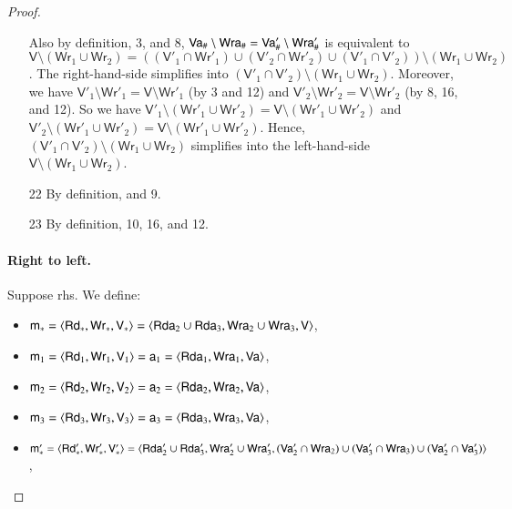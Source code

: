 \documentclass{llncs}
\newcommand{\modl}{\mathsf m}
\newcommand{\readset}{\mathsf{Rd}}
\newcommand{\valuset}{\mathsf{V}}
\newcommand{\writeset}{\mathsf{Wr}}
\newcommand{\tuple}[1]{ \langle #1 \rangle}
\begin{document}
\begin{proof}
\begin{itemize}
  Also by definition, 3, and 8, $\mathsf {Va}_\# \setminus \mathsf {Wra}_\# = \mathsf {Va}'_\# \setminus \mathsf {Wra}'_\#$ is equivalent to $\valuset \setminus (\writeset_1 \cup \writeset_2) = ((\valuset'_1 \cap \writeset'_1) \cup (\valuset'_2 \cap \writeset'_2) \cup (\valuset'_1 \cap \valuset'_2)) \setminus (\writeset_1 \cup \writeset_2)$. The right-hand-side simplifies into $(\valuset'_1 \cap \valuset'_2) \setminus (\writeset_1 \cup \writeset_2)$. Moreover, we have $\valuset'_1 \setminus \writeset'_1 = \valuset \setminus \writeset'_1$ (by 3 and 12) and $\valuset'_2 \setminus \writeset'_2 = \valuset \setminus \writeset'_2$ (by 8, 16, and 12). So we have $\valuset'_1 \setminus (\writeset'_1 \cup \writeset'_2) = \valuset \setminus (\writeset'_1 \cup \writeset'_2)$ and $\valuset'_2 \setminus (\writeset'_1 \cup \writeset'_2) = \valuset \setminus (\writeset'_1 \cup \writeset'_2)$. Hence, $(\valuset'_1 \cap \valuset'_2) \setminus (\writeset_1 \cup \writeset_2)$ simplifies into the left-hand-side $\valuset \setminus (\writeset_1 \cup \writeset_2)$.
\item[22] By definition, and 9.
\item[23] By definition, 10, 16, and 12.
\end{itemize}


\paragraph{Right to left.}

Suppose rhs. We define:
\begin{itemize}
\item $\modl_* = \tuple{\readset_*, \writeset_*, \valuset_*} = \tuple{\readseta_2 \cup \readseta_3, \writeseta_2 \cup \writeseta_3, \valuset}$,

\item $\modl_1 = \tuple{\readset_1, \writeset_1, \valuset_1} = \modla_1 = \tuple{\readseta_1, \writeseta_1, \valuseta}$,
\item $\modl_2 = \tuple{\readset_2, \writeset_2, \valuset_2} = \modla_2 = \tuple{\readseta_2, \writeseta_2, \valuseta}$,
\item $\modl_3 = \tuple{\readset_3, \writeset_3, \valuset_3} = \modla_3 = \tuple{\readseta_3, \writeseta_3, \valuseta}$,  

\item $\modl'_* = \tuple{\readset'_*, \writeset'_*, \valuset'_*} = \tuple{\readseta'_2 \cup \readseta'_3, \writeseta'_2 \cup \writeseta'_3, (\valuseta'_2 \cap \writeseta_2) \cup (\valuseta'_3 \cap \writeseta_3) \cup (\valuseta'_2 \cap \valuseta'_3)}$,
  

\end{itemize}
\end{proof}
\end{document}
